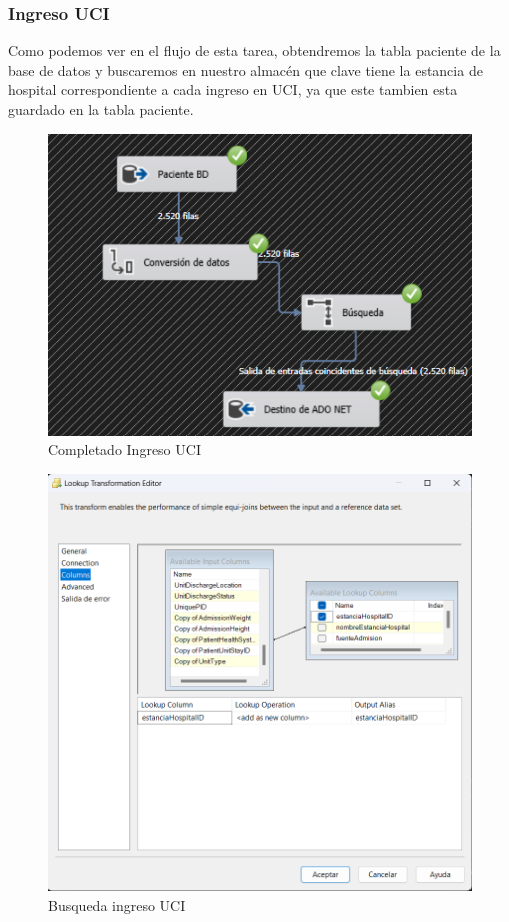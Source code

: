 \documentclass{article}
\begin{document}
	\subsubsection{Ingreso UCI}
	Como podemos ver en el flujo de esta tarea, obtendremos la tabla paciente de la base de datos y buscaremos en nuestro almacén que clave tiene la estancia de hospital correspondiente a cada ingreso en UCI, ya que este tambien esta guardado en la tabla paciente.
		\begin{figure}[H]
		\centering
		\includegraphics[width=.5\linewidth]{./images/completados/ingreso_uci.png}
		\caption{Completado Ingreso UCI}
	\end{figure}
	\begin{figure}[H]
		\centering
		\includegraphics[width=.7\linewidth]{./images/busquedas/ingreso_uci.png}
		\caption{Busqueda ingreso UCI}
	\end{figure}
\end{document}
